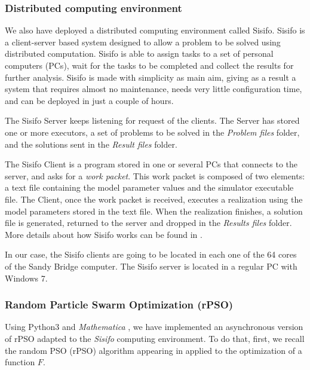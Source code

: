 \subsubsection{Distributed computing environment}
We also have deployed a distributed computing environment called Sisifo. Sisifo is a client-server based system designed to allow a problem to be solved using distributed computation. Sisifo is able to assign tasks to a set of personal computers (PCs), wait for the tasks to be completed and collect the results for further analysis. Sisifo is made with simplicity as main aim, giving as a result a system that requires almost no maintenance, needs very little configuration time, and can be deployed in just a couple of hours.

The Sisifo Server keeps listening for request of the clients. The Server has stored one or more executors, a set of problems to be solved in the \textit{Problem files} folder, and the solutions sent in the \textit{Result files} folder. 

The Sisifo Client is a program stored in one or several PCs that connects to the server, and asks for a \textit{work packet}. This work packet is composed of two elements: a text file containing the model parameter values and the simulator executable file. The Client, once the work packet is received, executes a realization using the model parameters stored in the text file. When the realization finishes, a solution file is generated, returned to the server and dropped in the \textit{Results files} folder. More details about how Sisifo works can be found in \cite{villanueva2013epidemic}.

In our case, the Sisifo clients are going to be located in each one of the 64 cores of the Sandy Bridge computer. The Sisifo server is located in a regular PC with Windows 7.

\subsubsection{Random Particle Swarm Optimization (rPSO)}
Using Python3 \cite{python3} and \textit{Mathematica} \cite{Mathematica}, we have implemented an asynchronous version of rPSO adapted to the  \textit{Sisifo} computing environment. To do that, first, we recall the random PSO (rPSO) algorithm appearing in \cite{khemka2008exploratory} applied to the optimization of a function $F$.


